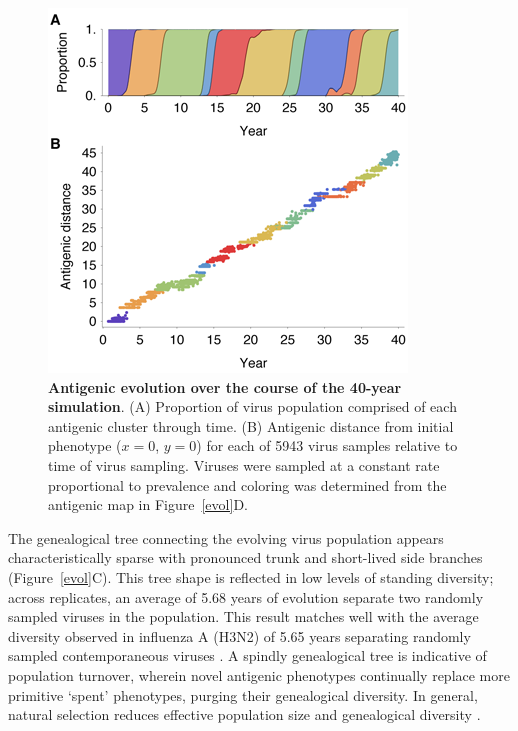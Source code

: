 \documentclass[11pt,oneside,letterpaper]{article}
\begin{document}
\begin{figure}[tb]
	\centering
	\includegraphics{figures/phenotypes}
	\caption{\textbf{Antigenic evolution over the course of the 40-year simulation}. (A) Proportion of virus population comprised of each antigenic cluster through time.  (B) Antigenic distance from initial phenotype ($x=0$, $y=0$) for each of 5943 virus samples relative to time of virus sampling.  Viruses were sampled at a constant rate proportional to prevalence and coloring was determined from the antigenic map in Figure~\ref{evol}D.}
	\label{phenotypes}
\end{figure}

The genealogical tree connecting the evolving virus population appears characteristically sparse with pronounced trunk and short-lived side branches  (Figure~\ref{evol}C).  This tree shape is reflected in low levels of standing diversity; across replicates, an average of 5.68 years of evolution separate two randomly sampled viruses in the population.  This result matches well with the average diversity observed in influenza A (H3N2) of 5.65 years separating randomly sampled contemporaneous viruses \cite{BedfordBMC11}.  A spindly genealogical tree is indicative of population turnover, wherein novel antigenic phenotypes continually replace more primitive `spent' phenotypes, purging their genealogical diversity.  In general, natural selection reduces effective population size and genealogical diversity \cite{BedfordBMC11}.  
\end{document}
